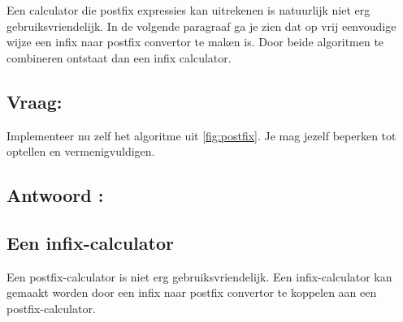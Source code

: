 \begin{cpplstShortInline}
Een calculator die postfix expressies kan uitrekenen is natuurlijk niet erg gebruiksvriendelijk.
In de volgende paragraaf ga je zien dat op vrij eenvoudige wijze een infix naar postfix convertor te maken is.
Door beide algoritmen te combineren ontstaat dan een infix calculator.

\subsection*{Vraag:}
Implementeer nu zelf het algoritme uit \cref{fig:postfix}.
Je mag jezelf beperken tot optellen en vermenigvuldigen.

\subsection*{Antwoord :}
\vspace{-.4\baselineskip}

\subsection{Een infix-calculator}
Een postfix-calculator is niet erg gebruiksvriendelijk.
Een infix-calculator kan gemaakt worden door een infix naar postfix convertor te koppelen aan een postfix-calculator.


\end{cpplstShortInline}
